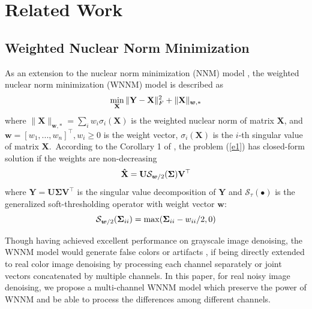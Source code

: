 \documentclass[10pt,twocolumn,letterpaper,sort&compress]{article}
\begin{document}
\section{Related Work}

\subsection{Weighted Nuclear Norm Minimization}
As an extension to the nuclear norm minimization (NNM) model \cite{cai2010singular}, the weighted nuclear norm minimization (WNNM) model \cite{wnnm} is described as 
\vspace{-1mm}
\begin{equation}
\label{e1}
\vspace{-1mm}
\min_{\mathbf{X}}\|\mathbf{Y}-\mathbf{X}\|_{F}^{2}
+
\|\mathbf{X}\|_{\bm{w},*}
\end{equation}
where $\|\mathbf{X}\|_{\bm{w},*}=\sum_{i}w_{i}\sigma_{i}(\mathbf{X})$ is the weighted nuclear norm of matrix $\mathbf{X}$, and $\bm{w}=[w_{1},...,w_{n}]^{\top}, w_{i}\ge 0$ is the weight vector, $\sigma_{i}(\mathbf{X})$ is the $i$-th singular value of matrix $\mathbf{X}$.\ According to the Corollary 1 of \cite{wnnmijcv}, the problem (\ref{e1}) has closed-form solution if the weights are non-decreasing
\vspace{-1mm}  
\begin{equation}
\label{e2}
\vspace{-1mm}
\mathbf{\hat{X}}
=
\mathbf{U}
\mathcal{S}_{\bm{w}/2}
(\mathbf{\Sigma})
\mathbf{V}^{\top}
\end{equation}
where $\mathbf{Y}=\mathbf{U}\mathbf{\Sigma}\mathbf{V}^{\top}$ is the singular value decomposition \cite{eckart1936approximation} of $\mathbf{Y}$ and 
$\mathcal{S}_{\tau}(\bullet)$ is the generalized soft-thresholding operator with weight vector $\bm{w}$:
\vspace{-1mm}
\begin{equation}
\label{e3}
\vspace{-1mm}
\mathcal{S}_{\bm{w}/2}
(\mathbf{\Sigma}_{ii})
=
\max(\mathbf{\Sigma}_{ii}-w_{ii}/2, 0)
\end{equation}

Though having achieved excellent performance on grayscale image denoising, the WNNM model would generate false colors or artifacts \cite{mairal2008sparse}, if being directly extended to real color image denoising by processing each channel separately or joint vectors concatenated by multiple channels. In this paper, for real noisy image denoising, we propose a multi-channel WNNM model which preserve the power of WNNM and be able to process the differences among different channels.
\end{document}
